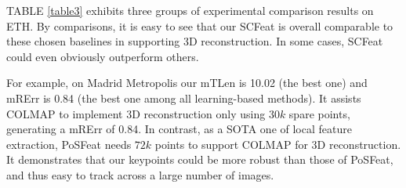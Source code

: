 \documentclass[journal]{IEEEtran}
\begin{document}
TABLE \ref{table3} exhibits three groups of experimental comparison results on ETH.
By comparisons, it is easy to see that our SCFeat is overall comparable to these chosen baselines in supporting 3D reconstruction. In some cases, 
SCFeat could even obviously outperform others.


For example, on Madrid Metropolis our mTLen is 10.02 (the best one) and mRErr is 0.84 (the best one among all learning-based methods). It assists COLMAP to implement 3D reconstruction only using 
$30k$ spare points, generating a mRErr of 0.84. In contrast, as a SOTA one of local feature extraction, PoSFeat needs 
$72k$ points to support COLMAP for 3D reconstruction. 
It demonstrates that our keypoints could be more robust than those of PoSFeat, and thus easy to track across a large number of images. 


\begin{table}[h]
\centering
\caption{Impact of Hyper-parameters: The comparisons of sparse 3D reconstruction results on ETH local feature benchmark. The maximum interest point number is limited to $20k$. 
}
\renewcommand\arraystretch{1.2}
\label{table21}
\end{table}
\end{document}
